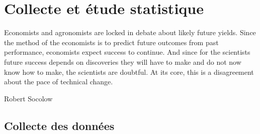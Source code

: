 \chapter{Collecte et étude statistique}
\epigraph{Economists and agronomists are locked in debate about likely
future yields. Since the method of the economists is to predict
future outcomes from past performance, economists expect
success to continue. And since for the scientists future success
depends on discoveries they will have to make and do not now
know how to make, the scientists are doubtful. At its core, this is
a disagreement about the pace of technical change.}{Robert
Socolow}	
\cleardoublepage
\newcommand{\reels}{\mathbb{R}}
	\section{Collecte des données}
